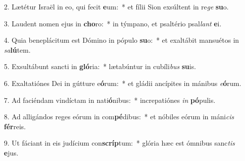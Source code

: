 2. Lætétur Israël in eo, qui fecit \textbf{e}um:~*  et fílii Sion exsúltent in re\textit{ge} \textbf{su}o.\

3. Laudent nomen ejus in \textbf{cho}ro:~*  in týmpano, et psaltério psal\textit{lant} \textbf{e}i.\

4. Quia beneplácitum est Dómino in pópulo \textbf{su}o:~*  et exaltábit mansuétos in \textit{sa}\textbf{lú}tem.\

5. Exsultábunt sancti in \textbf{gló}ria:~*  lætabúntur in cubíli\textit{bus} \textbf{su}is.\

6. Exaltatiónes Dei in gútture e\textbf{ó}rum:~*  et gládii ancípites in mánibus \textit{e}\textbf{ó}rum.\

7. Ad faciéndam vindíctam in nati\textbf{ó}nibus:~*  increpatiónes \textit{in} \textbf{pó}pulis.\

8. Ad alligándos reges eórum in com\textbf{pé}dibus:~*  et nóbiles eórum in máni\textit{cis} \textbf{fér}reis.\

9. Ut fáciant in eis judícium con\textbf{scríp}tum:~*  glória hæc est ómnibus sanc\textit{tis} \textbf{e}jus.\

